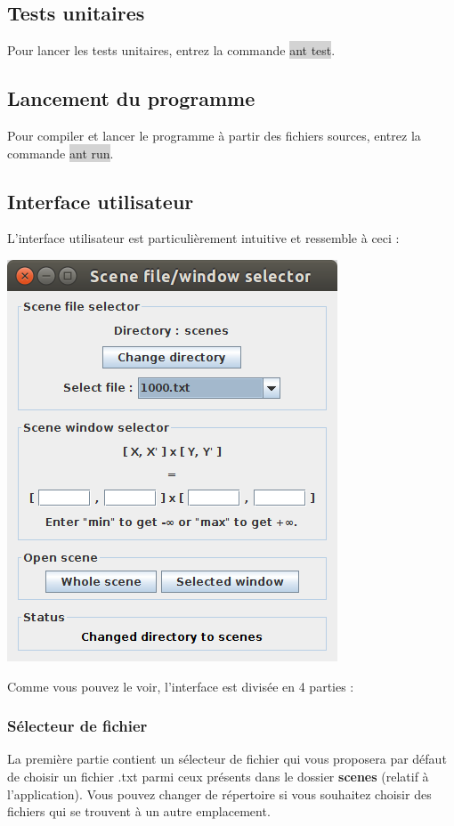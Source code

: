 \documentclass[10pt,a4paper]{article}
\begin{document}
\subsection{Tests unitaires}
Pour lancer les tests unitaires, entrez la commande \colorbox{lightgray}{ant test}.

\subsection{Lancement du programme}
Pour compiler et lancer le programme à partir des fichiers sources, entrez la commande \colorbox{lightgray}{ant run}.

\subsection{Interface utilisateur}
L'interface utilisateur est particulièrement intuitive et ressemble à ceci :

\centerline{\includegraphics[scale=0.5]{images/ui.png}}

Comme vous pouvez le voir, l'interface est divisée en 4 parties :
\subsubsection{Sélecteur de fichier}
La première partie contient un sélecteur de fichier qui vous proposera par défaut de choisir un fichier .txt parmi ceux présents dans le dossier \textbf{scenes} (relatif à l'application). Vous pouvez changer de répertoire si vous souhaitez choisir des fichiers qui se trouvent à un autre emplacement.
\end{document}

